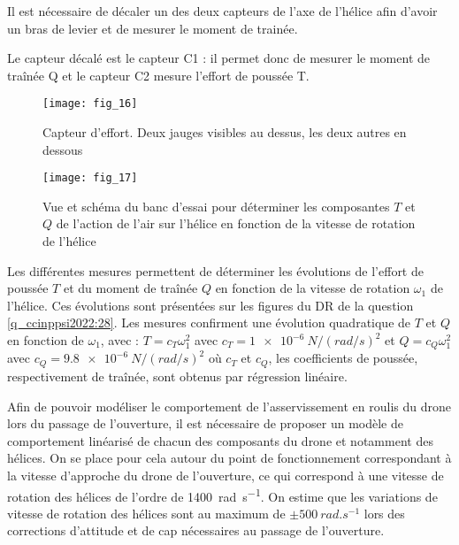 \ifprof
\begin{corrige}
Il est nécessaire de décaler un des deux capteurs de l’axe de l’hélice afin d’avoir un bras de levier et de mesurer le moment de trainée.

Le capteur décalé est le capteur C1 : il permet donc de mesurer le moment de traînée Q et le capteur C2 mesure l’effort de poussée T.
\end{corrige}
\else
\fi

\begin{figure}[H]
\centering
\texttt{[image: fig\_16]}
\caption{\label{fig_ccinppsi2022:16} Capteur d’effort. Deux jauges visibles au dessus, les deux autres en dessous}
\end{figure}

\begin{figure}[H]
\centering
\texttt{[image: fig\_17]}
\caption{\label{fig_ccinppsi2022:17} Vue et schéma du banc d’essai pour déterminer les composantes $T$ et $Q$ de
l’action de l’air sur l’hélice en fonction de la vitesse de rotation de l’hélice}
\end{figure}

Les différentes mesures permettent de déterminer les évolutions de l’effort de poussée $T$ et
du moment de traînée $Q$ en fonction de la vitesse de rotation $\omega_1$ de l’hélice. Ces évolutions
sont présentées sur les figures du DR de la question \ref{q_ccinppsi2022:28}. Les mesures confirment une évolution
quadratique de $T$ et $Q$ en fonction de $\omega_1$, avec :
$T = c_T \omega_1^2$ avec $c_T = \SI{1e-6}{N/(rad/s)^2}$ et
$Q = c_Q \omega_1^2$ avec $c_Q = \SI{9.8e-6}{N/(rad/s)^2}$ 
où $c_T$ et $c_Q$, les coefficients de poussée, respectivement de traînée, sont obtenus par régression linéaire.

Afin de pouvoir modéliser le comportement de l’asservissement en roulis du drone lors du
passage de l’ouverture, il est nécessaire de proposer un modèle de comportement linéarisé
de chacun des composants du drone et notamment des hélices. On se place pour cela autour
du point de fonctionnement correspondant à la vitesse d’approche du drone de l’ouverture,
ce qui correspond à une vitesse de rotation des hélices de l’ordre de \SI{1400}{rad.s^{-1}}. On estime
que les variations de vitesse de rotation des hélices sont au maximum de $\pm \SI{500}{rad.s^{-1}}$ lors
des corrections d’attitude et de cap nécessaires au passage de l’ouverture.

